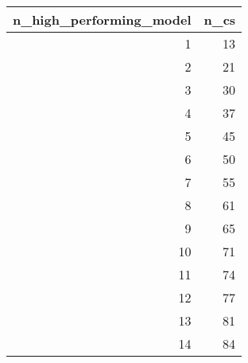 \begin{tabular}{rr}
\toprule
 n\_high\_performing\_model &  n\_cs \\
\midrule
                       1 &    13 \\
                       2 &    21 \\
                       3 &    30 \\
                       4 &    37 \\
                       5 &    45 \\
                       6 &    50 \\
                       7 &    55 \\
                       8 &    61 \\
                       9 &    65 \\
                      10 &    71 \\
                      11 &    74 \\
                      12 &    77 \\
                      13 &    81 \\
                      14 &    84 \\
\bottomrule
\end{tabular}
